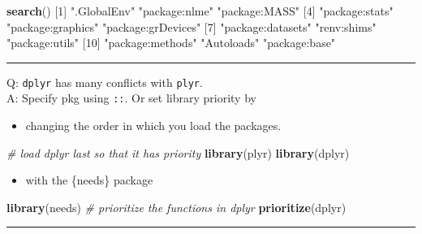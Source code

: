 \documentclass[
  a4paper,
  twoside,
  openright]{book}
\newenvironment{Shaded}{\begin{snugshade}}{\end{snugshade}}
\newcommand{\CommentTok}[1]{\textcolor[rgb]{0.56,0.35,0.01}{\textit{#1}}}
\newcommand{\DecValTok}[1]{\textcolor[rgb]{0.00,0.00,0.81}{#1}}
\newcommand{\FunctionTok}[1]{\textcolor[rgb]{0.13,0.29,0.53}{\textbf{#1}}}
\newcommand{\NormalTok}[1]{#1}
\newcommand{\StringTok}[1]{\textcolor[rgb]{0.31,0.60,0.02}{#1}}
\providecommand{\tightlist}{%
  \setlength{\itemsep}{0pt}\setlength{\parskip}{0pt}}
\theoremstyle{definition}
\theoremstyle{definition}
\theoremstyle{definition}
\theoremstyle{definition}
\theoremstyle{remark}
\begin{document}
\begin{Shaded}
\begin{Highlighting}[]
\FunctionTok{search}\NormalTok{()}
\NormalTok{ [}\DecValTok{1}\NormalTok{] }\StringTok{".GlobalEnv"}        \StringTok{"package:nlme"}      \StringTok{"package:MASS"}     
\NormalTok{ [}\DecValTok{4}\NormalTok{] }\StringTok{"package:stats"}     \StringTok{"package:graphics"}  \StringTok{"package:grDevices"}
\NormalTok{ [}\DecValTok{7}\NormalTok{] }\StringTok{"package:datasets"}  \StringTok{"renv:shims"}        \StringTok{"package:utils"}    
\NormalTok{[}\DecValTok{10}\NormalTok{] }\StringTok{"package:methods"}   \StringTok{"Autoloads"}         \StringTok{"package:base"}     
\end{Highlighting}
\end{Shaded}

\begin{center}\rule{0.5\linewidth}{0.5pt}\end{center}

Q: \texttt{dplyr} has many conflicts with \texttt{plyr}.\\
A: Specify pkg using \texttt{::}. Or set library priority by

\begin{itemize}
\tightlist
\item
  changing the order in which you load the packages.
\end{itemize}

\begin{Shaded}
\begin{Highlighting}[]
\CommentTok{\# load dplyr last so that it has priority}
\FunctionTok{library}\NormalTok{(plyr)}
\FunctionTok{library}\NormalTok{(dplyr)}
\end{Highlighting}
\end{Shaded}

\begin{itemize}
\tightlist
\item
  with the \{needs\} package
\end{itemize}

\begin{Shaded}
\begin{Highlighting}[]
\FunctionTok{library}\NormalTok{(needs)}
\CommentTok{\# prioritize the functions in dplyr}
\FunctionTok{prioritize}\NormalTok{(dplyr) }
\end{Highlighting}
\end{Shaded}

\begin{center}\rule{0.5\linewidth}{0.5pt}\end{center}
\end{document}
